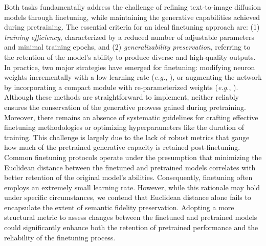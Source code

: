 Both tasks fundamentally address the challenge of refining text-to-image diffusion models through finetuning, while maintaining the generative capabilities achieved during pretraining. The essential criteria for an ideal finetuning approach are: (1) \emph{training efficiency}, characterized by a reduced number of adjustable parameters and minimal training epochs, and (2) \emph{generalizability preservation}, referring to the retention of the model’s ability to produce diverse and high-quality outputs. In practice, two major strategies have emerged for finetuning: modifying neuron weights incrementally with a low learning rate (\emph{e.g.}, \cite{ruiz2023dreambooth}), or augmenting the network by incorporating a compact module with re-parameterized weights (\emph{e.g.}, \cite{hulora2022,zhang2023adding}). Although these methods are straightforward to implement, neither reliably ensures the conservation of the generative prowess gained during pretraining. Moreover, there remains an absence of systematic guidelines for crafting effective finetuning methodologies or optimizing hyperparameters like the duration of training. This challenge is largely due to the lack of robust metrics that gauge how much of the pretrained generative capacity is retained post-finetuning. Common finetuning protocols operate under the presumption that minimizing the Euclidean distance between the finetuned and pretrained models correlates with better retention of the original model’s abilities. Consequently, finetuning often employs an extremely small learning rate. However, while this rationale may hold under specific circumstances, we contend that Euclidean distance alone fails to encapsulate the extent of semantic fidelity preservation. Adopting a more structural metric to assess changes between the finetuned and pretrained models could significantly enhance both the retention of pretrained performance and the reliability of the finetuning process.


